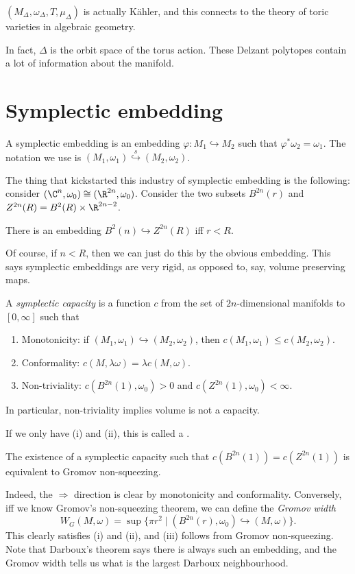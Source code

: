 \documentclass[a4paper]{article}
\begin{document}
$(M_\Delta, \omega_\Delta, T, \mu_\Delta)$ is actually K\"ahler, and this connects to the theory of toric varieties in algebraic geometry.

In fact, $\Delta$ is the orbit space of the torus action. These Delzant polytopes contain a lot of information about the manifold. %

\section{Symplectic embedding}
A symplectic embedding is an embedding $\varphi: M_1 \hookrightarrow M_2$ such that $\varphi^* \omega_2 = \omega_1$. The notation we use is $(M_1, \omega_1) \overset{s}{\hookrightarrow} (M_2, \omega_2)$.


The thing that kickstarted this industry of symplectic embedding is the following: consider $(\C^n, \omega_0) \cong (\R^{2n}, \omega_0)$. Consider the two subsets $B^{2n}(r)$ and $Z^{2n}(R) = B^2(R) \times \R^{2n - 2}$. %
\begin{thm}
  There is an embedding $B^{2}(n) \hookrightarrow Z^{2n}(R)$ iff $r < R$.
\end{thm}
Of course, if $n < R$, then we can just do this by the obvious embedding. This says symplectic embeddings are very rigid, as opposed to, say, volume preserving maps.

\begin{defi}
  A \emph{symplectic capacity} is a function $c$ from the set of $2n$-dimensional manifolds to $[0, \infty]$ such that
  \begin{enumerate}
    \item Monotonicity: if $(M_1, \omega_1) \hookrightarrow (M_2, \omega_2)$, then $c(M_1, \omega_1) \leq c(M_2, \omega_2)$.
    \item Conformality: $c(M, \lambda \omega) = \lambda c(M, \omega)$.
    \item Non-triviality: $c(B^{2n}(1), \omega_0) > 0$ and $c(Z^{2n}(1), \omega_0) < \infty$.
  \end{enumerate}
\end{defi}
In particular, non-triviality implies volume is not a capacity.

If we only have (i) and (ii), this is called a .

The existence of a symplectic capacity such that $c(B^{2n}(1)) = c(Z^{2n}(1))$ is equivalent to Gromov non-squeezing. 

Indeed, the $\Rightarrow$ direction is clear by monotonicity and conformality. Conversely, iff we know Gromov's non-squeezing theorem, we can define the \emph{Gromov width}
\[
  W_G(M, \omega) = \sup \{\pi r^2 \mid (B^{2n}(r), \omega_0) \hookrightarrow (M, \omega)\}.
\]
This clearly satisfies (i) and (ii), and (iii) follows from Gromov non-squeezing. Note that Darboux's theorem says there is always such an embedding, and the Gromov width tells us what is the largest Darboux neighbourhood.
\printindex
\end{document}
